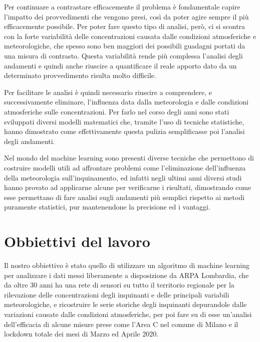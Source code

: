 Per continuare a contrastare efficacemente il problema è fondamentale capire l'impatto dei provvedimenti che vengono presi, così da poter agire sempre il più efficacemente possibile. Per poter fare questo tipo di analisi, però, ci si scontra con la forte variabilità delle concentrazioni causata dalle condizioni atmosferiche e meteorologiche, che spesso sono ben maggiori dei possibili guadagni portati da una misura di contrasto. Questa variabilità rende più complessa l'analisi degli andamenti e quindi anche riuscire a quantificare il reale apporto dato da un determinato provvedimento risulta molto difficile.

Per facilitare le analisi è quindi necessario riuscire a comprendere, e successivamente eliminare, l'influenza data dalla meteorologia e dalle condizioni atmosferiche sulle concentrazioni. Per farlo nel corso degli anni sono stati sviluppati diversi modelli matematici che, tramite l'uso di tecniche statistiche, hanno dimostrato come effettivamente questa pulizia semplificasse poi l'analisi degli andamenti.

Nel mondo del machine learning sono presenti diverse tecniche che permettono di costruire modelli utili ad affrontare problemi come l'eliminazione dell'influenza della meteorologia sull'inquinamento, ed infatti negli ultimi anni diversi studi hanno provato ad applicarne alcune per verificarne i risultati, dimostrando come esse permettano di fare analisi sugli andamenti più semplici rispetto ai metodi puramente statistici, pur mantenendone la precisione ed i vantaggi.

\section{Obbiettivi del lavoro}
Il nostro obbiettivo è stato quello di utilizzare un algoritmo di machine learning per analizzare i dati messi liberamente a disposizione da ARPA Lombardia, che da oltre 30 anni ha una rete di sensori su tutto il territorio regionale per la rilevazione delle concentrazioni degli inquinanti e delle principali variabili meteorologiche, e ricostruire le serie storiche degli inquinanti depurandole dalle variazioni causate dalle condizioni atmosferiche, per poi fare su di esse un'analisi dell'efficacia di alcune misure prese come l'Area C nel comune di Milano e il lockdown totale dei mesi di Marzo ed Aprile 2020.

